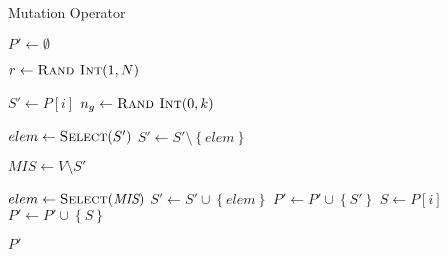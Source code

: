\begin{algorithm}[h]
  \caption{Mutation Operator}\label{alg:GENETIKUS_ALGORITMUS:MUTACIO}
  \begin{algorithmic}[1]
    \State $P' \leftarrow \emptyset$

    \State $r \leftarrow \Call{Rand Int}{1, N}$

    \State $S' \leftarrow P[i]$
    \State $n_{g} \leftarrow \Call{Rand Int}{0, k}$

    \State $elem \leftarrow \Call{Select}{S'}$
    \State $S' \leftarrow S' \setminus \left\{ elem \right\}$
    \EndFor

    \State $\textit{MIS} \leftarrow V \setminus S'$

    \State $elem \leftarrow \Call{Select}{\textit{MIS}}$
    \State $S' \leftarrow S' \cup \left\{ elem \right\}$
    \EndWhile
    \State $P' \leftarrow P' \cup \left\{ S' \right\}$
    \Else
    \State $S \leftarrow P\left[ i \right]$
    \State $P' \leftarrow P' \cup \left\{ S \right\}$
    \EndIf
    \EndFor

    \State \Return $P'$
    \EndFunction
  \end{algorithmic}
\end{algorithm}
